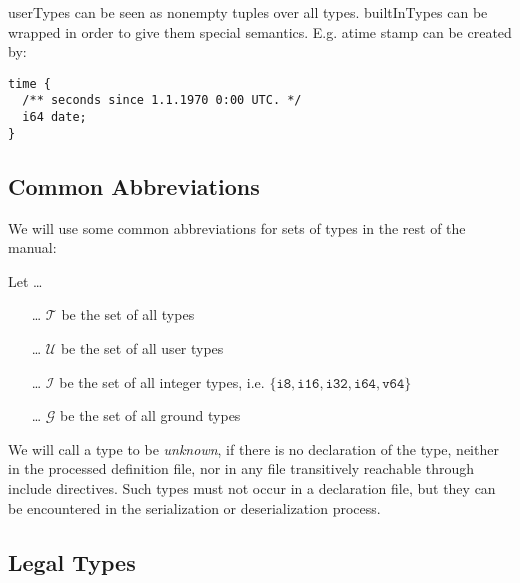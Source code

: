 \documentclass[a4paper,10pt]{article}
\begin{document}
\Glspl{userType} can be seen as nonempty tuples over all types. \Glspl{builtInType} can be wrapped in order to give them special semantics. E.g. atime stamp can be created by:
\begin{lstlisting}[label=timeExample,caption=Time,language=skill]
time {
  /** seconds since 1.1.1970 0:00 UTC. */
  i64 date;
}
\end{lstlisting}

\subsection*{Common Abbreviations}

We will use some common abbreviations for sets of types in the rest of the manual:

Let \ldots
\begin{itemize}
 \item[\ldots] $\mathcal{T}$ be the set of all types
 \item[\ldots] $\mathcal{U}$ be the set of all user types
 \item[\ldots] $\mathcal{I}$ be the set of all integer types, i.e. $\{\texttt{i8},\texttt{i16},\texttt{i32},\texttt{i64},\texttt{v64}\}$
 \item[\ldots] $\mathcal{G}$ be the set of all ground types
\end{itemize}

We will call a type to be \textit{unknown}, if there is no declaration of the type, neither in the processed definition file, nor in any file transitively reachable through include directives. Such types must not occur in a declaration file, but they can be encountered in the serialization or deserialization process.


\subsection*{Legal Types}

% 
\end{document}
